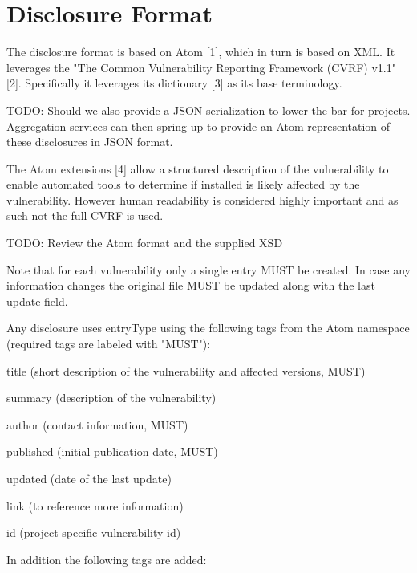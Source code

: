 \section{Disclosure Format}

The disclosure format is based on Atom [1], which in turn is based on XML. It leverages the "The Common Vulnerability Reporting Framework (CVRF) v1.1" [2]. Specifically it leverages its dictionary [3] as its base terminology.

TODO: Should we also provide a JSON serialization to lower the bar for projects. Aggregation services can then spring up to provide an Atom representation of these disclosures in JSON format.

The Atom extensions [4] allow a structured description of the vulnerability to enable automated tools to determine if installed is likely affected by the vulnerability. However human readability is considered highly important and as such not the full CVRF is used.

TODO: Review the Atom format and the supplied XSD

Note that for each vulnerability only a single entry MUST be created. In case any information changes the original file MUST be updated along with the last update field.

Any disclosure uses entryType using the following tags from the Atom namespace (required tags are labeled with "MUST"):

\begin{compactitem}
\item title (short description of the vulnerability and affected versions, MUST)
\item summary (description of the vulnerability)
\item author (contact information, MUST)
\item published (initial publication date, MUST)
\item updated (date of the last update)
\item link (to reference more information)
\item id (project specific vulnerability id)
\end{compactitem}

In addition the following tags are added:


